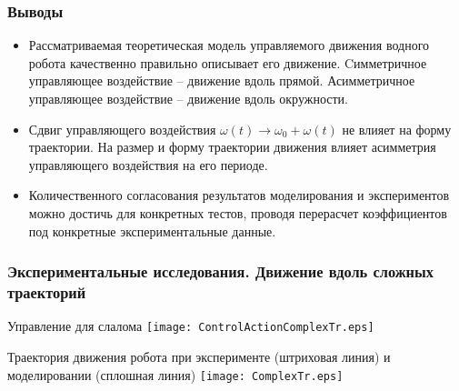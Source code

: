 \begin{frame}
\frametitle{Выводы}
\begin{itemize}
	\item Рассматриваемая теоретическая модель управляемого движения водного робота качественно правильно описывает его движение. Cимметричное управляющее воздействие -- движение вдоль прямой. Асимметричное управляющее воздействие -- движение вдоль окружности.
	
	\item Сдвиг управляющего воздействия $\omega(t) \rightarrow \omega_0 + \omega(t)$ не влияет на форму траектории. На размер и форму траектории движения влияет асимметрия управляющего воздействия на его периоде.
	
	\item Количественного согласования результатов моделирования и экспериментов можно достичь для конкретных тестов, проводя перерасчет коэффициентов под конкретные экспериментальные данные.
	
\end{itemize}

\end{frame}


\begin{frame}
\frametitle{Экспериментальные исследования. Движение вдоль сложных траекторий}


	{Управление для слалома}
	\centering
	\texttt{[image: ControlActionComplexTr.eps]}

	{Траектория движения робота при эксперименте (штриховая линия) и моделировании (сплошная линия)}
	\centering
	\texttt{[image: ComplexTr.eps]}


\end{frame}


